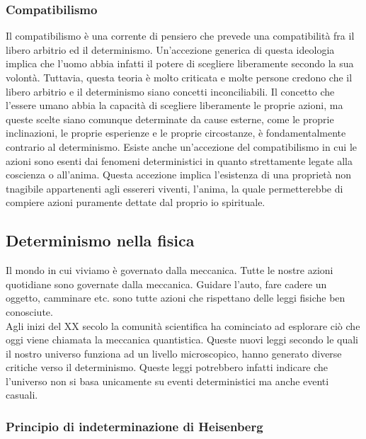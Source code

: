 \documentclass[a4paper, 12pt]{article}
\begin{document}
\subsubsection{Compatibilismo}

Il compatibilismo è una corrente di pensiero che prevede una compatibilità
fra il libero arbitrio ed il determinismo. Un'accezione generica di questa ideologia
implica che l'uomo abbia infatti il potere di scegliere liberamente secondo la sua volontà.
Tuttavia, questa teoria è molto criticata e molte persone credono che
il libero arbitrio e il determinismo siano concetti inconciliabili.
Il concetto che l'essere umano abbia la capacità di scegliere liberamente le proprie azioni,
ma queste scelte siano comunque determinate da cause esterne,
come le proprie inclinazioni, le proprie esperienze e le proprie circostanze,
è fondamentalmente contrario al determinismo.
Esiste anche un'accezione del compatibilismo in cui le azioni sono
esenti dai fenomeni deterministici in quanto strettamente legate alla coscienza o all'anima.
Questa accezione implica l'esistenza di una proprietà non tnagibile
appartenenti agli essereri viventi, l'anima, la quale permetterebbe di compiere
azioni puramente dettate dal proprio io spirituale.

\subsection{Determinismo nella fisica}

Il mondo in cui viviamo è governato dalla meccanica.
Tutte le nostre azioni quotidiane sono governate dalla meccanica.
Guidare l'auto, fare cadere un oggetto, camminare etc. sono tutte azioni
che rispettano delle leggi fisiche ben conosciute. \\
Agli inizi del XX secolo la comunità scientifica ha cominciato ad esplorare ciò che
oggi viene chiamata la meccanica quantistica. Queste nuovi leggi secondo le quali il nostro universo funziona
ad un livello microscopico, hanno generato diverse critiche verso il determinismo.
Queste leggi potrebbero infatti indicare che l'universo non si basa unicamente su eventi deterministici ma anche eventi casuali.

\subsubsection{Principio di indeterminazione di Heisenberg}
\end{document}
